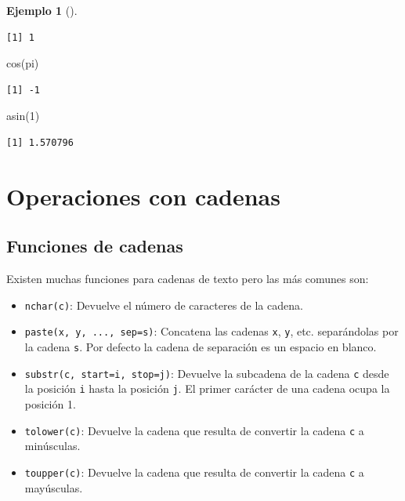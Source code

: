 \documentclass[
  a4paper,
]{scrreport}
\newenvironment{Shaded}{\begin{snugshade}}{\end{snugshade}}
\newcommand{\DecValTok}[1]{\textcolor[rgb]{0.68,0.00,0.00}{#1}}
\newcommand{\FunctionTok}[1]{\textcolor[rgb]{0.28,0.35,0.67}{#1}}
\newcommand{\NormalTok}[1]{\textcolor[rgb]{0.00,0.23,0.31}{#1}}
\providecommand{\tightlist}{%
  \setlength{\itemsep}{0pt}\setlength{\parskip}{0pt}}\usepackage{longtable,booktabs,array}
\theoremstyle{definition}
\theoremstyle{definition}
\newtheorem{example}{Ejemplo}[chapter]
\theoremstyle{remark}
\begin{document}
\begin{example}[]
\begin{verbatim}
[1] 1
\end{verbatim}

\begin{Shaded}
\begin{Highlighting}[]
\FunctionTok{cos}\NormalTok{(pi)}
\end{Highlighting}
\end{Shaded}

\begin{verbatim}
[1] -1
\end{verbatim}

\begin{Shaded}
\begin{Highlighting}[]
\FunctionTok{asin}\NormalTok{(}\DecValTok{1}\NormalTok{)}
\end{Highlighting}
\end{Shaded}

\begin{verbatim}
[1] 1.570796
\end{verbatim}

\end{example}

\hypertarget{operaciones-con-cadenas}{%
\section{Operaciones con cadenas}\label{operaciones-con-cadenas}}

\hypertarget{funciones-de-cadenas}{%
\subsection{Funciones de cadenas}\label{funciones-de-cadenas}}

Existen muchas funciones para cadenas de texto pero las más comunes son:

\begin{itemize}
\tightlist
\item
  \texttt{nchar(c)}: Devuelve el número de caracteres de la cadena.
\item
  \texttt{paste(x,\ y,\ ...,\ sep=s)}: Concatena las cadenas \texttt{x},
  \texttt{y}, etc. separándolas por la cadena \texttt{s}. Por defecto la
  cadena de separación es un espacio en blanco.
\item
  \texttt{substr(c,\ start=i,\ stop=j)}: Devuelve la subcadena de la
  cadena \texttt{c} desde la posición \texttt{i} hasta la posición
  \texttt{j}. El primer carácter de una cadena ocupa la posición 1.
\item
  \texttt{tolower(c)}: Devuelve la cadena que resulta de convertir la
  cadena \texttt{c} a minúsculas.
\item
  \texttt{toupper(c)}: Devuelve la cadena que resulta de convertir la
  cadena \texttt{c} a mayúsculas.
\end{itemize}
\end{document}
